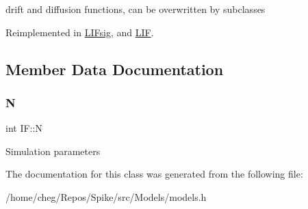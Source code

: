 drift and diffusion functions, can be overwritten by subclasses 

Reimplemented in \mbox{\hyperlink{classLIFsig_a169dcb5d3704157102bbc725445cf0a5}{L\+I\+Fsig}}, and \mbox{\hyperlink{classLIF_aea677a0cf3f943edb7a957479e18d6dc}{L\+IF}}.



\subsection{Member Data Documentation}
\mbox{\label{classIF_aa81bddacf949214f2265214d7174f4c2}} 
\subsubsection{\texorpdfstring{N}{N}}
{\footnotesize\ttfamily int I\+F\+::N}

Simulation parameters 

The documentation for this class was generated from the following file\+:\begin{DoxyCompactItemize}
\item 
/home/cheg/\+Repos/\+Spike/src/\+Models/models.\+h\end{DoxyCompactItemize}

